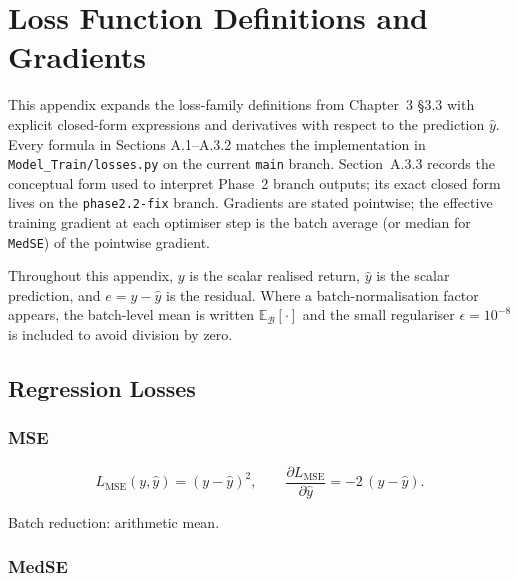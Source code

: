 \chapter{Loss Function Definitions and Gradients}

\label{chap:loss-definitions}

This appendix expands the loss-family definitions from Chapter~3 \S3.3 with explicit closed-form expressions and derivatives with respect to the prediction $\hat y$. Every formula in Sections A.1--A.3.2 matches the implementation in \texttt{Model\_Train/losses.py} on the current \texttt{main} branch. Section~A.3.3 records the conceptual form used to interpret Phase~2 branch outputs; its exact closed form lives on the \texttt{phase2.2-fix} branch. Gradients are stated pointwise; the effective training gradient at each optimiser step is the batch average (or median for \texttt{MedSE}) of the pointwise gradient.

Throughout this appendix, $y$ is the scalar realised return, $\hat y$ is the scalar prediction, and $e = y - \hat y$ is the residual. Where a batch-normalisation factor appears, the batch-level mean is written $\mathbb{E}_{\mathcal{B}}[\cdot]$ and the small regulariser $\epsilon = 10^{-8}$ is included to avoid division by zero.

\section{Regression Losses}

\label{sec:regression-losses}

\subsection{MSE}

\label{subsec:mse}

\begin{equation}
L_{\mathrm{MSE}}(y, \hat y) = (y - \hat y)^2,
\qquad
\frac{\partial L_{\mathrm{MSE}}}{\partial \hat y} = -2\,(y - \hat y).
\end{equation}

Batch reduction: arithmetic mean.

\subsection{MedSE}

\label{subsec:medse}

